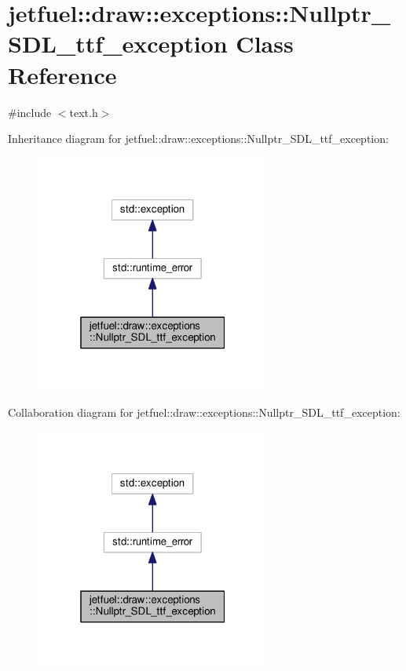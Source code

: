 \hypertarget{classjetfuel_1_1draw_1_1exceptions_1_1Nullptr__SDL__ttf__exception}{}\section{jetfuel\+:\+:draw\+:\+:exceptions\+:\+:Nullptr\+\_\+\+S\+D\+L\+\_\+ttf\+\_\+exception Class Reference}
\label{classjetfuel_1_1draw_1_1exceptions_1_1Nullptr__SDL__ttf__exception}


{\ttfamily \#include $<$text.\+h$>$}



Inheritance diagram for jetfuel\+:\+:draw\+:\+:exceptions\+:\+:Nullptr\+\_\+\+S\+D\+L\+\_\+ttf\+\_\+exception\+:
\nopagebreak
\begin{figure}[H]
\begin{center}
\leavevmode
\includegraphics[width=217pt]{classjetfuel_1_1draw_1_1exceptions_1_1Nullptr__SDL__ttf__exception__inherit__graph}
\end{center}
\end{figure}


Collaboration diagram for jetfuel\+:\+:draw\+:\+:exceptions\+:\+:Nullptr\+\_\+\+S\+D\+L\+\_\+ttf\+\_\+exception\+:
\nopagebreak
\begin{figure}[H]
\begin{center}
\leavevmode
\includegraphics[width=217pt]{classjetfuel_1_1draw_1_1exceptions_1_1Nullptr__SDL__ttf__exception__coll__graph}
\end{center}
\end{figure}

